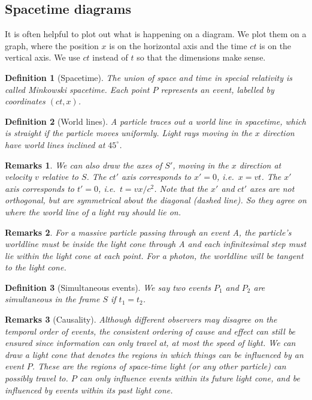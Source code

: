 \documentclass[a4paper]{article}
\newtheorem{remarks}{Remarks}[section]
\theoremstyle{new}
\newtheorem{defi}{Definition}[section]
\begin{document}
\subsection{Spacetime diagrams}
It is often helpful to plot out what is happening on a diagram. We plot them on a graph, where the position $x$ is on the horizontal axis and the time $ct$ is on the vertical axis. We use $ct$ instead of $t$ so that the dimensions make sense.
\begin{defi}[Spacetime]
  The union of space and time in special relativity is called Minkowski spacetime. Each point $P$ represents an event, labelled by coordinates $(ct, x)$. 
\end{defi}
\begin{defi}[World lines]
  A particle traces out a world line in spacetime, which is straight if the particle moves uniformly. Light rays moving in the $x$ direction have world lines inclined at $45^\circ$.
\end{defi}
\begin{remarks}
We can also draw the axes of $S'$, moving in the $x$ direction at velocity $v$ relative to $S$. The $ct'$ axis corresponds to $x' = 0$, i.e.\ $x = vt$. The $x'$ axis corresponds to $t' = 0$, i.e.\ $t = vx/c^2$. Note that the $x'$ and $ct'$ axes are not orthogonal, but are symmetrical about the diagonal (dashed line). So they agree on where the world line of a light ray should lie on.
\end{remarks}
\begin{remarks}
For a massive particle passing through an event A, the particle's worldline must be inside the light cone through A and each infinitesimal step must lie within the light cone at each point. For a photon, the worldline will be tangent to the light cone.
\end{remarks}
\begin{defi}[Simultaneous events]
  We say two events $P_1$ and $P_2$ are simultaneous in the frame $S$ if $t_1 = t_2$.
\end{defi}
\begin{remarks}[Causality]
Although different observers may disagree on the temporal order of events, the consistent ordering of cause and effect can still be ensured since information can only travel at, at most the speed of light. We can draw a light cone that denotes the regions in which things can be influenced by an event $P$. These are the regions of space-time light (or any other particle) can possibly travel to. $P$ can only influence events within its future light cone, and be influenced by events within its past light cone.
\end{remarks}
\end{document}
